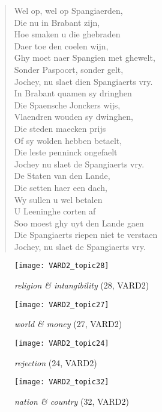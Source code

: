\begin{quote}
	Wel op, wel op Spangiaerden,\\
	Die nu in Brabant zijn,\\
	Hoe smaken u die ghebraden\\
	Daer toe den coelen wijn,\\
	Ghy moet naer Spangien met ghewelt,\\
	Sonder Paspoort, sonder gelt,\\
	Jochey, nu slaet dien Spangiaerts vry.\\
	
	In Brabant quamen sy dringhen\\
	Die Spaensche Jonckers wijs,\\
	Vlaendren wouden sy dwinghen,\\
	Die steden maecken prijs\\
	Of sy wolden hebben betaelt,\\
	Die leste penninck ongefaelt\\
	Jochey nu slaet de Spangiaerts vry.\\
	
	De Staten van den Lande,\\
	Die setten haer een dach,\\
	Wy sullen u wel betalen\\
	U Leeninghe corten af\\
	Soo moest ghy uyt den Lande gaen\\
	Die Spangiaerts riepen niet te verstaen\\
	Jochey, nu slaet de Spangiaerts vry.
\end{quote}

\begin{figure}
	\begin{minipage}[c]{0.48\linewidth}
		\texttt{[image: VARD2\_topic28]}
		\caption{\textit{religion \& intangibility} (28, VARD2)}
		\label{fig:topic28VARD2}
		\vspace{4ex}
	\end{minipage}%
	\begin{minipage}[c]{0.48\linewidth}
		\texttt{[image: VARD2\_topic27]}
		\caption{\textit{world \& money} (27, VARD2)}
		\label{fig:topic27VARD2}
		\vspace{4ex}
	\end{minipage}%
	\hfill
	\begin{minipage}[c]{0.48\linewidth}
		\texttt{[image: VARD2\_topic24]}
		\caption{\textit{rejection} (24, VARD2)}
		\label{fig:topic24VARD2}
		\vspace{4ex}
	\end{minipage}%
	\begin{minipage}[c]{0.48\linewidth}
		\texttt{[image: VARD2\_topic32]}
		\caption{\textit{nation \& country} (32, VARD2)}
		\label{fig:topic32VARD2}
		\vspace{4ex}
	\end{minipage}%
\end{figure}

